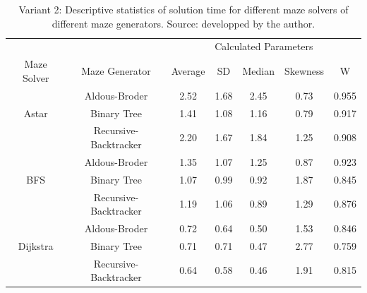          \begin{table}[!ht]
            \centering
            \caption{Variant 2: Descriptive statistics of solution time for different maze solvers of different maze generators. Source: developped by the author.} 
            \begin{tabular}{c c c c c c c}
            \hline
                ~&~&\multicolumn{5}{c}{Calculated Parameters}\\
                Maze Solver & Maze Generator & Average & SD & Median & Skewness & W\\ \hline \hline
                ~ & Aldous-Broder  & 2.52 & 1.68 & 2.45 & 0.73 & 0.955\\ 
                Astar & Binary Tree & 1.41 & 1.08 & 1.16 & 0.79 & 0.917\\ 
                ~ & Recursive-Backtracker & 2.20 & 1.67 & 1.84 & 1.25 & 0.908\\ \hline
                ~ & Aldous-Broder  & 1.35 & 1.07 & 1.25 & 0.87 & 0.923\\ 
                BFS & Binary Tree & 1.07 & 0.99 & 0.92 & 1.87 & 0.845 \\ 
                ~ & Recursive-Backtracker & 1.19 & 1.06 & 0.89 & 1.29 & 0.876\\ \hline
                ~ & Aldous-Broder & 0.72 & 0.64 & 0.50 & 1.53 & 0.846 \\ 
                Dijkstra & Binary Tree & 0.71 & 0.71 & 0.47 & 2.77 & 0.759\\ 
                ~ & Recursive-Backtracker & 0.64 & 0.58 & 0.46 & 1.91 & 0.815 \\ \hline
            \end{tabular}
        \end{table}
\newpage
\newline
\newpage\
\\
\\
\\
\\
\\
\newline
\newline
\newline
\newline

